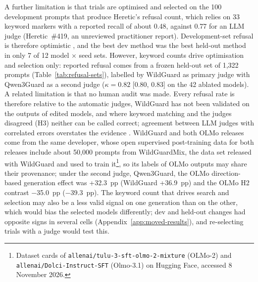 A further limitation is that trials are optimised and selected on the 100
development prompts that produce Heretic's refusal count, which relies on 33
keyword markers with a reported recall of about 0.48, against 0.77 for an LLM
judge (Heretic~\#419, an unreviewed practitioner report). Development-set refusal is therefore optimistic
\cite{cawley2010overfitting}, and the best dev method was the best held-out
method in only 7 of 12 model $\times$ seed sets. However, keyword counts drive
optimisation and selection only: reported refusal comes from a frozen held-out
set of 1,322 prompts (Table~\ref{tab:refusal-sets}), labelled by WildGuard as
primary judge with Qwen3Guard as a second judge ($\kappa=0.82$ [0.80, 0.83]
on the 42 ablated models).
A related limitation is that no human audit was made. Every refusal rate is
therefore relative to the automatic judges, WildGuard has not been validated
on the outputs of edited models, and where keyword matching and the judges
disagreed (H3) neither can be called correct; agreement between LLM judges
with correlated errors overstates the evidence \cite{hossain2026agreement}.
WildGuard and both OLMo releases come from the same developer, whose open
supervised post-training data for both releases include about 50,000 prompts
from WildGuardMix, the data set released with WildGuard and used to train it\footnote{Dataset
cards of \texttt{allenai/tulu-3-sft-olmo-2-mixture} (OLMo-2) and
\texttt{allenai/Dolci-Instruct-SFT} (Olmo-3.1) on Hugging Face, accessed
8 November 2026.}, so its labels of OLMo outputs may share their provenance; under the second judge,
Qwen3Guard, the OLMo direction-based generation effect was +32.3~pp (WildGuard
+36.9~pp) and the OLMo H2 contrast $-$35.0~pp ($-$39.3~pp). The keyword count
that drives search and selection may also be a less valid signal on one
generation than on the other, which would bias the selected models
differently; dev and held-out changes had opposite signs in several cells
(Appendix~\ref{app:moved-results}), and re-selecting trials with a judge
would test this.

